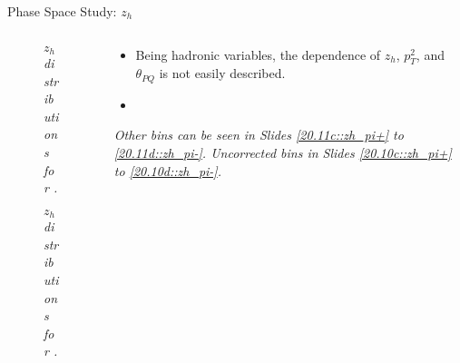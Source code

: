 \begin{frame}{Phase Space Study: $z_h$}
    \label{12.14::zh}

    \begin{columns}[onlytextwidth,T]

    \begin{column}{.44\linewidth}
        \vspace{-15pt}
        \begin{center}
            \begin{figure}[t]
                \scriptsize{\textit{$z_h$ distributions for \ef{$\pi^-$}.}}
            \end{figure}

            \vspace{-15pt}
            \begin{figure}[t]
                \scriptsize{\textit{$z_h$ distributions for \ef{$\pi^+$}.}}
            \end{figure}
        \end{center}
    \end{column}

    \begin{column}{.54\linewidth}
        \begin{itemize}
            \item
                Being hadronic variables, the \ef{$\theta$} dependence of $z_h$, $p_T^2$, and $\theta_{PQ}$ is not easily described.

            \vspace{12pt}
            \item

        \end{itemize}

        \vspace{114pt}

        \begin{flushright}
            \tiny{\textit{
                Other bins can be seen in Slides \textcolor{efd_purple}{\ref{20.11c::zh_pi+}} to \textcolor{efd_purple}{\ref{20.11d::zh_pi-}}.
                Uncorrected bins in Slides \textcolor{efd_purple}{\ref{20.10c::zh_pi+}} to \textcolor{efd_purple}{\ref{20.10d::zh_pi-}}.
            }}
        \end{flushright}
    \end{column}

    \end{columns}
\end{frame}


